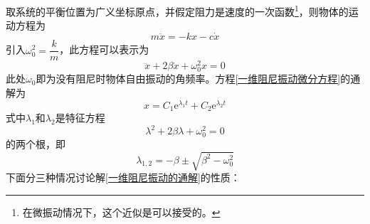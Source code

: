 取系统的平衡位置为广义坐标原点，并假定阻力是速度的一次函数\footnote{在微振动情况下，这个近似是可以接受的。}，则物体的运动方程为
\begin{equation*}
	m\ddot{x} = -kx - c\dot{x}
\end{equation*}
引入$\omega_0^2 = \dfrac{k}{m}$，此方程可以表示为
\begin{equation}
	\ddot{x} + 2\beta \dot{x} + \omega_0^2 x = 0
	\label{一维阻尼振动微分方程}
\end{equation}
此处$\omega_0$即为没有阻尼时物体自由振动的角频率。方程\eqref{一维阻尼振动微分方程}的通解为
\begin{equation}
	x = C_1 \mathrm{e}^{\lambda_1 t} + C_2 \mathrm{e}^{\lambda_2 t}
	\label{一维阻尼振动的通解}
\end{equation}
式中$\lambda_1$和$\lambda_2$是特征方程
\begin{equation*}
	\lambda^2 + 2\beta \lambda + \omega_0^2 = 0
\end{equation*}
的两个根，即
\begin{equation}
	\lambda_{1,2} = -\beta \pm \sqrt{\beta^2-\omega_0^2}
\end{equation}
下面分三种情况讨论解\eqref{一维阻尼振动的通解}的性质：
